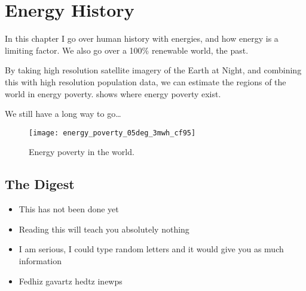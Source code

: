 \setchapterpreamble[u]{\margintoc}
\chapter{Energy History}

In this chapter I go over human history with energies, and how energy is a limiting factor. We also go over a 100\% renewable world, the past.


By taking high resolution satellite imagery of the Earth at Night, and combining this with high resolution population data, we can estimate the regions of the world in energy poverty.  shows where energy poverty exist.

We still have a long way to go\ldots

\begin{figure*}[h]
	\texttt{[image: energy\_poverty\_05deg\_3mwh\_cf95]}
	\caption[Energy poverty in the world.]{Energy poverty in the world.}
\end{figure*}


\section{The Digest}

\begin{kaoboxgreen}[frametitle=Main Takeaways]

\begin{itemize}
\item This has not been done yet
\item Reading this will teach you absolutely nothing
\item I am serious, I could type random letters and it would give you as much information
\item Fedhiz gavartz hedtz inewps
\end{itemize}
  
\end{kaoboxgreen}